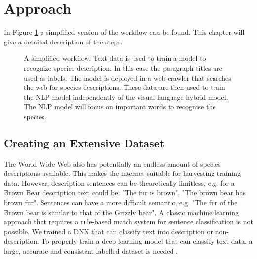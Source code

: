 \documentclass[a4paper, 12pt, oneside]{book} %
\begin{document}
\newpage
\section{Approach}

In Figure \ref{fig:workflow} a simplified version of the workflow can be found.
This chapter will give a detailed description of the steps.

\begin{figure} [htbp]
    \centering
    \caption[Workflow]{A simplified workflow. Text data is used to train a model to recognize species description. In this case the paragraph titles are used as labels. The model is deployed in a web crawler that searches the web for species descriptions. These data are then used to train the NLP model independently of the visual-language hybrid model. The NLP model will focus on important words to recognise the species.}
    \label{fig:workflow}
\end{figure}

\subsection{Creating an Extensive Dataset}
The World Wide Web also has potentially an endless amount of species descriptions available.
This makes the internet suitable for harvesting training data.
However, description sentences can be theoretically limitless, e.g. for a Brown Bear description text could be: "The fur is brown", "The brown bear has brown fur".
Sentences can have a more difficult semantic, e.g. "The fur of the Brown bear is similar to that of the Grizzly bear".
A classic machine learning approach that requires a rule-based match system for sentence classification is not possible. 
We trained a DNN that can classify text into description or non-description.
To properly train a deep learning model that can classify text data, a large, accurate and consistent labelled dataset is needed \autocite{munappy_data_2019}.
\end{document}
